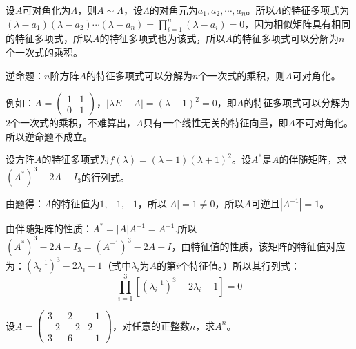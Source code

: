 \documentclass[a4paper]{report}
\begin{document}
\begin{zhengming}
设$A$可对角化为$\Lambda$，则$A\sim \Lambda$，设$\Lambda$的对角元为$a_1,a_2,\cdots,a_n$。所以$\Lambda$的特征多项式为$(\lambda-a_1)(\lambda-a_2)\cdots(\lambda-a_n)=\prod\limits_{i=1}^{n}(\lambda-a_i)=0$，因为相似矩阵具有相同的特征多项式，所以$A$的特征多项式也为该式，所以$A$的特征多项式可以分解为$n$个一次式的乘积。

逆命题：$n$阶方阵$A$的特征多项式可以分解为$n$个一次式的乘积，则$A$可对角化。

例如：$A=
\begin{pmatrix}
1&1\\0&1
\end{pmatrix}
$，$|\lambda E-A|=(\lambda-1)^2=0$，即$A$的特征多项式可以分解为$2$个一次式的乘积，不难算出，$A$只有一个线性无关的特征向量，即$A$不可对角化。所以逆命题不成立。
\end{zhengming}

\EX 设方阵$A$的特征多项式为$f(\lambda)=(\lambda-1)(\lambda+1)^2$。设$A^*$是$A$的伴随矩阵，求$(A^*)^3-2A-I_3$的行列式。

\begin{jie}
由题得：$A$的特征值为$1,-1,-1$，所以$|A|=1\neq 0$，所以$A$可逆且$|A^{-1}|=1$。

由伴随矩阵的性质：$A^*=|A|A^{-1}=A^{-1}$.所以$(A^*)^3-2A-I_3=(A^{-1})^3-2A-I$，由特征值的性质，该矩阵的特征值对应为：$(\lambda_{i}^{-1})^3-2\lambda_{i}-1$（式中$\lambda_i$为$A$的第$i$个特征值。）所以其行列式：
\begin{equation*}
\prod_{i=1}^{3}\left[(\lambda_{i}^{-1})^3-2\lambda_{i}-1\right]=0
\end{equation*}
\end{jie}

\EX 设$
A=
\begin{pmatrix}
3&2&-1\\
-2&-2&2\\
3&6&-1
\end{pmatrix}
$，对任意的正整数$n$，求$A^{n}$。
\end{document}

